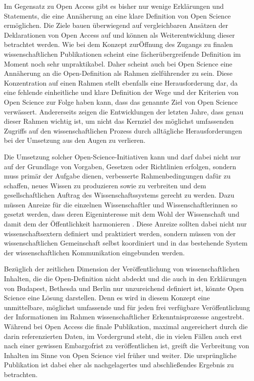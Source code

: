 Im Gegensatz zu Open Access gibt es bisher nur wenige Erklärungen und Statements, die eine Annäherung an eine klare Definition von Open Science ermöglichen. Die Ziele bauen überwiegend auf vergleichbaren Ansätzen der Deklarationen von Open Access auf und können als Weiterentwicklung dieser betrachtet werden. Wie bei dem Konzept zurÖffnung des Zugangs zu finalen wissenschaftlichen Publikationen scheint eine fächerübergreifende Definition im Moment noch sehr unpraktikabel. Daher scheint auch bei Open Science eine Annäherung an die Open-Definition als Rahmen zielführender zu sein. Diese Konzentration auf einen Rahmen stellt ebenfalls eine Herausforderung dar, da eine fehlende einheitliche und klare Definition der Wege und der Kriterien von Open Science zur Folge haben kann, dass das genannte Ziel von Open Science verwässert. Andererseits zeigen die Entwicklungen der letzten Jahre, dass genau dieser Rahmen wichtig ist, um nicht das Kernziel des möglichst umfassenden Zugriffs auf den wissenschaftlichen Prozess durch alltägliche Herausforderungen bei der Umsetzung aus den Augen zu verlieren.

Die Umsetzung solcher Open-Science-Initiativen kann und darf dabei nicht nur auf der Grundlage von Vorgaben, Gesetzen oder Richtlinien erfolgen, sondern muss primär der Aufgabe dienen, verbesserte Rahmenbedingungen dafür zu schaffen, neues Wissen zu produzieren sowie zu verbreiten und dem gesellschaftlichen Auftrag des Wissenschaftssystems gerecht zu werden. Dazu müssen Anreize für die einzelnen Wissenschaftler und Wissenschaftlerinnen so gesetzt werden, dass deren Eigeninteresse mit dem Wohl der Wissenschaft und damit dem der Öffentlichkeit harmonieren \cite{brembs2015open}. Diese Anreize sollten dabei nicht nur wissenschaftsextern definiert und praktiziert werden, sondern müssen von der wissenschaftlichen Gemeinschaft selbst koordiniert und in das bestehende System der wissenschaftlichen Kommunikation eingebunden werden.

Bezüglich der zeitlichen Dimension der Veröffentlichung von wissenschaftlichen Inhalten, die die Open-Definition nicht abdeckt und die auch in den Erklärungen von Budapest, Bethesda und Berlin nur unzureichend definiert ist, könnte Open Science eine Lösung darstellen. Denn es wird in diesem Konzept eine unmittelbare, möglichst umfassende und für jeden frei verfügbare Veröffentlichung der Informationen im Rahmen wissenschaftlicher Erkenntnisprozesse angestrebt. Während bei Open Access die finale Publikation, maximal angereichert durch die darin referenzierten Daten, im Vordergrund steht, die in vielen Fällen auch erst nach einer gewissen Embargofrist zu veröffentlichen ist, greift die Verbreitung von Inhalten im Sinne von Open Science viel früher und weiter. Die ursprüngliche Publikation ist dabei eher als nachgelagertes und abschließendes Ergebnis zu betrachten.

